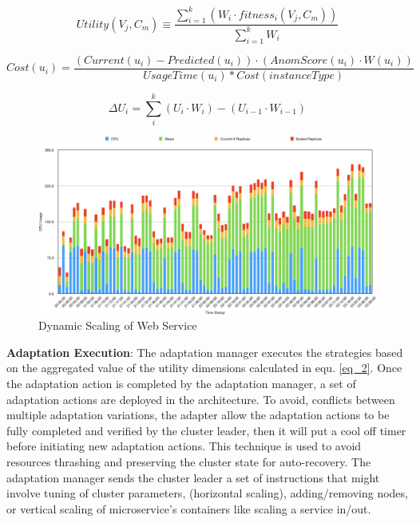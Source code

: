 \documentclass[sigconf]{acmart}
\begin{document}
\begin{equation}
\label{eq_2}
    Utility(V_{j},C_{m}) \equiv \frac{ \sum_{i=1}^{k} (W_{i} \cdot fitness_{i}(V_{j},C_{m}) ) }{\sum_{i=1}^{k} W_{i}}
\end{equation}
 
\begin{equation}
\label{eq_3}
Cost(u_{i}) = \frac{(Current(u_{i}) - Predicted(u_{i}))\cdot (AnomScore(u_{i}) \cdot W(u_{i}))}{UsageTime(u_{i}) * Cost(instanceType)}
\end{equation}


 \begin{equation}
\label{eq_4}
\Delta U_{i}=\sum_{i}^{k} (U_{i}\cdot W_{i})-(U_{i-1}\cdot W_{i-1})
\end{equation}

\begin{figure}[!ht]   
\includegraphics[scale=0.3]{ScalingService}
\caption{ Dynamic Scaling of Web Service}
\label{fig_Scale}
\end{figure} 


\textbf{Adaptation Execution}: The adaptation manager executes the strategies based on the aggregated value of the utility dimensions calculated in equ. \ref{eq_2}. Once the adaptation action is completed by the adaptation manager, a set of adaptation actions are deployed in the architecture. To avoid, conflicts between multiple adaptation variations, the adapter allow the adaptation actions to be fully completed and verified by the cluster leader, then it will put a cool off timer before initiating new adaptation actions. This technique is used to avoid resources thrashing and preserving the cluster state for auto-recovery. The adaptation manager sends the cluster leader a set of instructions that might involve tuning of cluster parameters, (horizontal scaling), adding/removing nodes, or vertical scaling of microservice's containers like scaling a service in/out.  
\end{document}
